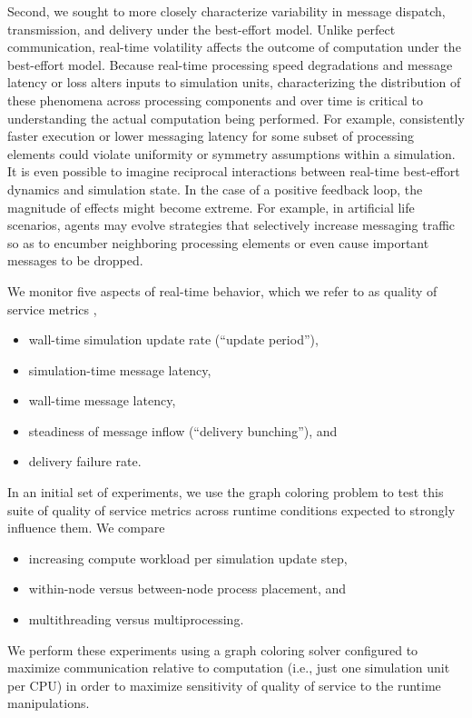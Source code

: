 Second, we sought to more closely characterize variability in message dispatch, transmission, and delivery under the best-effort model.
Unlike perfect communication, real-time volatility affects the outcome of computation under the best-effort model.
Because real-time processing speed degradations and message latency or loss alters inputs to simulation units, characterizing the distribution of these phenomena across processing components and over time is critical to understanding the actual computation being performed.
For example, consistently faster execution or lower messaging latency for some subset of processing elements could violate uniformity or symmetry assumptions within a simulation.
It is even possible to imagine reciprocal interactions between real-time best-effort dynamics and simulation state.
In the case of a positive feedback loop, the magnitude of effects might become extreme.
For example, in artificial life scenarios, agents may evolve strategies that selectively increase messaging traffic so as to encumber neighboring processing elements or even cause important messages to be dropped.

We monitor five aspects of real-time behavior, which we refer to as quality of service metrics \citep{karakus2017quality},
\begin{itemize}
  \item wall-time simulation update rate (``update period''),
  \item simulation-time message latency,
  \item wall-time message latency,
  \item steadiness of message inflow (``delivery bunching''), and
  \item delivery failure rate.
\end{itemize}

In an initial set of experiments, we use the graph coloring problem to test this suite of quality of service metrics across runtime conditions expected to strongly influence them.
We compare
\begin{itemize}
  \item increasing compute workload per simulation update step,
  \item within-node versus between-node process placement, and
  \item multithreading versus multiprocessing.
\end{itemize}
We perform these experiments using a graph coloring solver configured to maximize communication relative to computation (i.e., just one simulation unit per CPU) in order to maximize sensitivity of quality of service to the runtime manipulations.

